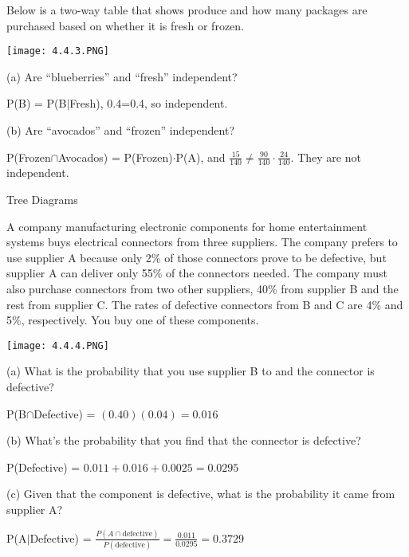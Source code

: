 \documentclass[../stats.tex]{subfiles}
\begin{document}
\begin{example}
    Below is a two-way table that shows produce and how many packages are purchased based on whether it is fresh or frozen.
    \begin{center}
        \texttt{[image: 4.4.3.PNG]}
    \end{center}

    (a) Are ``blueberries'' and ``fresh'' independent?

    P(B) = P(B$|$Fresh), 0.4=0.4, so independent.

    (b) Are ``avocados'' and ``frozen'' independent?

    P(Frozen$\cap$Avocados) = P(Frozen)$\cdot$P(A), and $\frac{15}{140}\neq \frac{90}{140}\cdot\frac{24}{140}$. They are not independent.
\end{example}

Tree Diagrams

\pagebreak
\begin{example}
    A company manufacturing electronic components for home entertainment systems buys electrical connectors from three suppliers. The company prefers to use supplier A because only 
    2\% of those connectors prove to be defective, but supplier A can deliver only 55\% of the connectors needed. The company must also purchase connectors from two other suppliers, 40\% from supplier B and the rest from supplier C. The rates of defective connectors from B and C are 4\% and 5\%, respectively. You buy one of these components.
    \begin{center}
        \texttt{[image: 4.4.4.PNG]}
    \end{center}

    (a) What is the probability that you use supplier B to and the connector is defective?
    
    P(B$\cap$Defective) = $(0.40)(0.04)=0.016$

    (b) What's the probability that you find that the connector is defective?

    P(Defective) = $0.011+0.016+0.0025=0.0295$

    (c) Given that the component is defective, what is the probability it came from supplier A?

    P(A$|$Defective) = $\frac{P(A\cap \text{defective})}{P(\text{defective})} = \frac{0.011}{0.0295}=0.3729$
\end{example}
\end{document}
